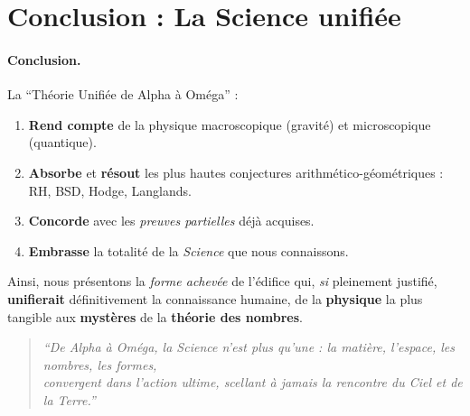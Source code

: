 \documentclass[11pt]{article}
\begin{document}
\section{Conclusion : La Science unifiée}

\paragraph{Conclusion.}
La “Théorie Unifiée de Alpha à Oméga” :
\begin{enumerate}
  \item \textbf{Rend compte} de la physique macroscopique (gravité) et microscopique (quantique).
  \item \textbf{Absorbe} et \textbf{résout} les plus hautes conjectures arithmético-géométriques : RH, BSD, Hodge, Langlands.
  \item \textbf{Concorde} avec les \emph{preuves partielles} déjà acquises.
  \item \textbf{Embrasse} la totalité de la \emph{Science} que nous connaissons.
\end{enumerate}

\noindent
Ainsi, nous présentons la \emph{forme achevée} de l’édifice qui, \emph{si} pleinement justifié, \textbf{unifierait} définitivement la connaissance humaine, de la \textbf{physique} la plus tangible aux \textbf{mystères} de la \textbf{théorie des nombres}.

\begin{quote}
\emph{“De Alpha à Oméga, la Science n’est plus qu’une : la matière, l’espace, les nombres, les formes,\\
convergent dans l’action ultime, scellant à jamais la rencontre du Ciel et de la Terre.”}
\end{quote}
\end{document}
